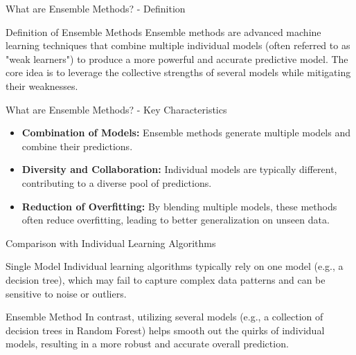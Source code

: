 \documentclass[aspectratio=169]{beamer}
\begin{document}
\begin{frame}[fragile]{What are Ensemble Methods? - Definition}
    \begin{block}{Definition of Ensemble Methods}
        Ensemble methods are advanced machine learning techniques that combine multiple individual models (often referred to as "weak learners") to produce a more powerful and accurate predictive model. The core idea is to leverage the collective strengths of several models while mitigating their weaknesses.
    \end{block}
\end{frame}

\begin{frame}[fragile]{What are Ensemble Methods? - Key Characteristics}
    \begin{itemize}
        \item \textbf{Combination of Models:} Ensemble methods generate multiple models and combine their predictions.
        \item \textbf{Diversity and Collaboration:} Individual models are typically different, contributing to a diverse pool of predictions.
        \item \textbf{Reduction of Overfitting:} By blending multiple models, these methods often reduce overfitting, leading to better generalization on unseen data.
    \end{itemize}
\end{frame}

\begin{frame}[fragile]{Comparison with Individual Learning Algorithms}
    \begin{block}{Single Model}
        Individual learning algorithms typically rely on one model (e.g., a decision tree), which may fail to capture complex data patterns and can be sensitive to noise or outliers.
    \end{block}
    
    \begin{block}{Ensemble Method}
        In contrast, utilizing several models (e.g., a collection of decision trees in Random Forest) helps smooth out the quirks of individual models, resulting in a more robust and accurate overall prediction.
    \end{block}
\end{frame}
\end{document}
